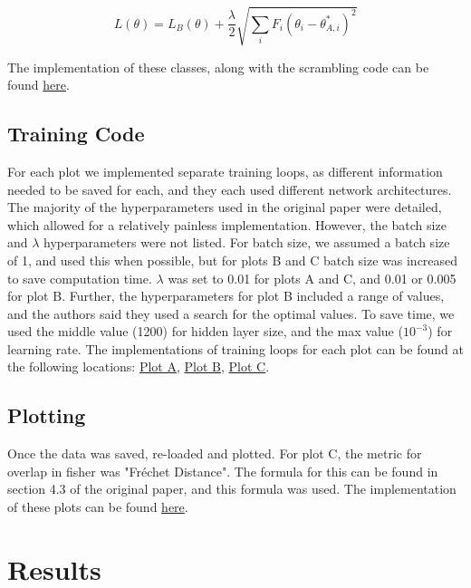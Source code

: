 \documentclass{article}
\begin{document}
$$
L(\theta) = L_{B}(\theta) + \frac{\lambda}{2} \sqrt{\sum_{i}F_{i}(\theta_{i} - \theta^{*}_{A,i})^2}
$$

The implementation of these classes, along with the scrambling code can be found \href{https://github.com/spohngellert-o/Pytorch-EWC-Replication/blob/main/utils.py}{here}.

\subsection{Training Code}

For each plot we implemented separate training loops, as different information needed to be saved for each, and they each used different network architectures. The majority of the hyperparameters used in the original paper were detailed, which allowed for a relatively painless implementation. However, the batch size and $\lambda$ hyperparameters were not listed. For batch size, we assumed a batch size of 1, and used this when possible, but for plots B and C batch size was increased to save computation time. $\lambda$ was set to 0.01 for plots A and C, and 0.01 or 0.005 for plot B. Further, the hyperparameters for plot B included a range of values, and the authors said they used a search for the optimal values. To save time, we used the middle value (1200) for hidden layer size, and the max value ($10^{-3}$) for learning rate. The implementations of training loops for each plot can be found at the following locations: \href{https://github.com/spohngellert-o/Pytorch-EWC-Replication/blob/main/plot_a.py}{Plot A}, \href{https://github.com/spohngellert-o/Pytorch-EWC-Replication/blob/main/plot_b.py}{Plot B}, \href{https://github.com/spohngellert-o/Pytorch-EWC-Replication/blob/main/plot_c.py}{Plot C}. 

\subsection{Plotting}

Once the data was saved, re-loaded and plotted. For plot C, the metric for overlap in fisher was "Fr\' echet Distance". The formula for this can be found in section 4.3 of the original paper, and this formula was used. The implementation of these plots can be found \href{https://github.com/spohngellert-o/Pytorch-EWC-Replication/blob/main/MakePlots.ipynb}{here}.

\section{Results}
\end{document}
